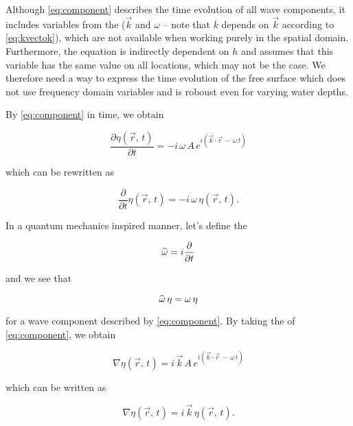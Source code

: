 Although \eqref{eq:component} describes the time evolution of all wave components, it includes variables from the  ($\vec{k}$ and $\omega$ -- note that $k$ depends on $\vec{k}$ according to \eqref{eq:kvectok}), which are not available when working purely in the spatial domain. Furthermore, the equation is indirectly dependent on $h$ and assumes that this variable has the same value on all locations, which may not be the case. We therefore need a way to express the time evolution of the free surface which does not use frequency domain variables and is roboust even for varying water depths.

By  \eqref{eq:component} in time, we obtain

\begin{equation}
\frac{\partial\eta(\vec{r},\,t)}{\partial t} = -i\,\omega\,A\,e^{i(\vec{k}\cdot\vec{r}\,-\,\omega\,t)}
\end{equation}

which can be rewritten as

\begin{equation}
\frac{\partial}{\partial t}\eta(\vec{r},\,t) = -i\,\omega\,\eta(\vec{r},\,t).
\end{equation}

In a quantum mechanics inspired manner, let's define the 

\begin{equation} \label{eq:opomega}
\widehat{\omega} = i\frac{\partial}{\partial t}
\end{equation}

and we see that

\begin{equation} \label{eq:opomegaaction}
\widehat{\omega}\,\eta = \omega\,\eta
\end{equation}

for a wave component described by \eqref{eq:component}. By taking the  of \eqref{eq:component}, we obtain

\begin{equation}
\nabla\eta(\vec{r},\,t) = i\,\vec{k}\,A\,e^{i(\vec{k}\cdot\vec{r}\,-\,\omega\,t)}
\end{equation}

which can be written as

\begin{equation}
\nabla\eta(\vec{r},\,t) = i\,\vec{k}\,\eta(\vec{r},\,t).
\end{equation}

